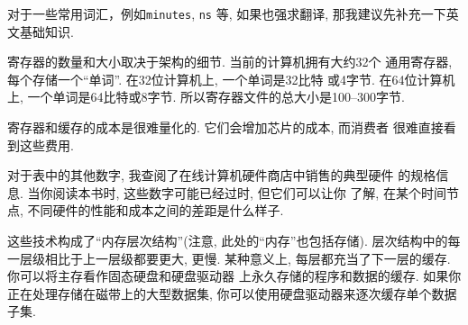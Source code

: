 \documentclass[12pt]{book}
\begin{document}
{\begin{note}
对于一些常用词汇，例如{\tt minutes}, {\tt ns} 等, 如果也强求翻译,
那我建议先补充一下英文基础知识.
\end{note}


寄存器的数量和大小取决于架构的细节. 当前的计算机拥有大约32个
通用寄存器, 每个存储一个``单词''. 在32位计算机上, 一个单词是32比特
或4字节. 在64位计算机上, 一个单词是64比特或8字节. 
所以寄存器文件的总大小是100--300字节.

寄存器和缓存的成本是很难量化的. 它们会增加芯片的成本, 而消费者
很难直接看到这些费用. 

对于表中的其他数字, 我查阅了在线计算机硬件商店中销售的典型硬件
的规格信息. 当你阅读本书时, 这些数字可能已经过时, 但它们可以让你
了解, 在某个时间节点, 不同硬件的性能和成本之间的差距是什么样子.

这些技术构成了``内存层次结构''(注意, 此处的``内存''也包括存储).
层次结构中的每一层级相比于上一层级都要更大, 更慢. 某种意义上, 
每层都充当了下一层的缓存. 你可以将主存看作固态硬盘和硬盘驱动器
上永久存储的程序和数据的缓存. 
如果你正在处理存储在磁带上的大型数据集, 
你可以使用硬盘驱动器来逐次缓存单个数据子集.

}
\end{document}
